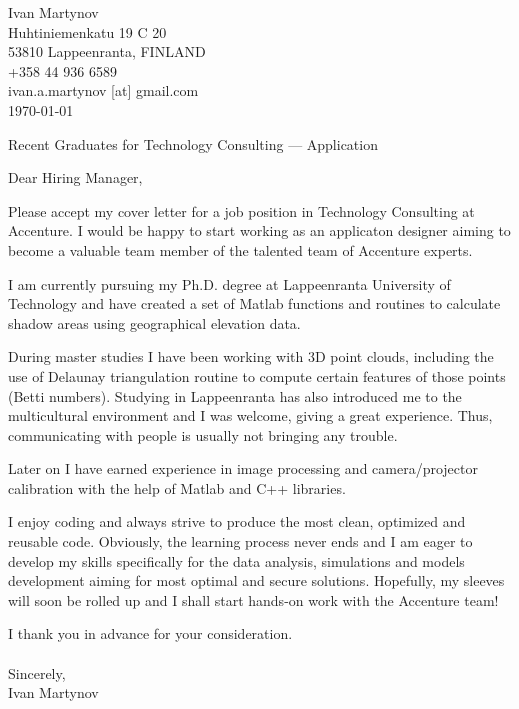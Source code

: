 \documentclass[]{article}
\begin{document}
\begin{flushright}
	Ivan Martynov\\
  Huhtiniemenkatu 19 C 20\\
	53810 Lappeenranta, FINLAND\\
	+358 44 936 6589\\
	ivan.a.martynov [at] gmail.com\\
	\today
\end{flushright}


\begin{center}
  Recent Graduates for Technology Consulting --- Application
\end{center}

\noindent
Dear Hiring Manager,
\bigskip

\noindent
Please accept my cover letter for a job position in Technology Consulting at
Accenture. I would be happy to start working as an applicaton designer aiming
to become a valuable team member of the talented team of Accenture experts.
\medskip

\noindent
I am currently pursuing my Ph.D. degree at Lappeenranta University of
Technology and have created a set of Matlab functions and routines to
calculate shadow areas using geographical elevation data.
\medskip

\noindent
During master studies I have been working with 3D point clouds, including the
use of Delaunay triangulation routine to compute certain features of those
points (Betti numbers).
\noindent
Studying in Lappeenranta has also introduced me to the multicultural environment
and I was welcome, giving a great experience. Thus, communicating with people is
usually not bringing any trouble.
\medskip

\noindent
Later on I have earned experience in image processing and camera/projector
calibration with the help of Matlab and C++ libraries.
\medskip

\noindent
I enjoy coding and always strive to produce the most clean, optimized and
reusable code. Obviously, the learning process never ends and I am eager to
develop my skills specifically for the data analysis, simulations and models
development aiming for most optimal and secure solutions.  Hopefully, my sleeves
will soon be rolled up and I shall start hands-on work with the Accenture team!
\medskip

\noindent
I thank you in advance for your consideration.\\\ \\

\noindent Sincerely,\\
Ivan Martynov
\end{document}
